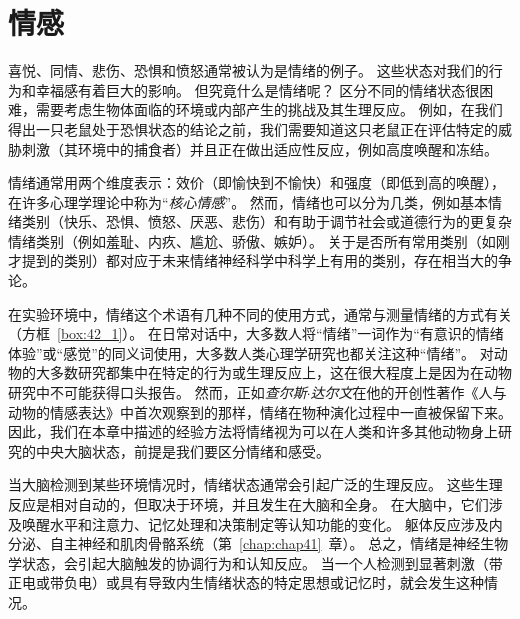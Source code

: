 \chapter{情感} \label{chap:chap42}

喜悦、同情、悲伤、恐惧和愤怒通常被认为是情绪的例子。
这些状态对我们的行为和幸福感有着巨大的影响。
但究竟什么是情绪呢？
区分不同的情绪状态很困难，需要考虑生物体面临的环境或内部产生的挑战及其生理反应。
例如，在我们得出一只老鼠处于恐惧状态的结论之前，我们需要知道这只老鼠正在评估特定的威胁刺激（其环境中的捕食者）并且正在做出适应性反应，例如高度唤醒和冻结。


情绪通常用两个维度表示：效价（即愉快到不愉快）和强度（即低到高的唤醒），在许多心理学理论中称为“\textit{核心情感}”。
然而，情绪也可以分为几类，例如基本情绪类别（快乐、恐惧、愤怒、厌恶、悲伤）和有助于调节社会或道德行为的更复杂情绪类别（例如羞耻、内疚、尴尬、骄傲、嫉妒）。
关于是否所有常用类别（如刚才提到的类别）都对应于未来情绪神经科学中科学上有用的类别，存在相当大的争论。


在实验环境中，情绪这个术语有几种不同的使用方式，通常与测量情绪的方式有关（方框~\ref{box:42_1}）。
在日常对话中，大多数人将“情绪”一词作为“有意识的情绪体验”或“感觉”的同义词使用，大多数人类心理学研究也都关注这种“情绪”。
对动物的大多数研究都集中在特定的行为或生理反应上，这在很大程度上是因为在动物研究中不可能获得口头报告。
然而，正如\textit{查尔斯$\cdot$达尔文}在他的开创性著作《人与动物的情感表达》中首次观察到的那样，情绪在物种演化过程中一直被保留下来。
因此，我们在本章中描述的经验方法将情绪视为可以在人类和许多其他动物身上研究的中央大脑状态，前提是我们要区分情绪和感受。


当大脑检测到某些环境情况时，情绪状态通常会引起广泛的生理反应。
这些生理反应是相对自动的，但取决于环境，并且发生在大脑和全身。
在大脑中，它们涉及唤醒水平和注意力、记忆处理和决策制定等认知功能的变化。
躯体反应涉及内分泌、自主神经和肌肉骨骼系统（第~\ref{chap:chap41}~章）。
总之，情绪是神经生物学状态，会引起大脑触发的协调行为和认知反应。
当一个人检测到显著刺激（带正电或带负电）或具有导致内生情绪状态的特定思想或记忆时，就会发生这种情况。


